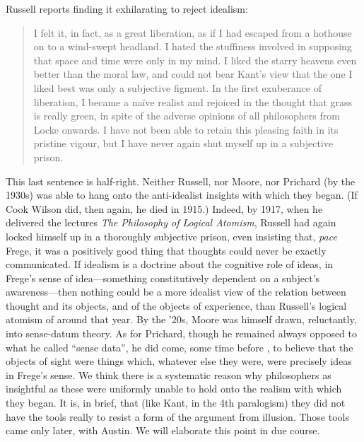 Russell reports finding it exhilarating to reject idealism:
\begin{quote}
	I felt it, in fact, as a great liberation, as if I had escaped from a hothouse on to a wind-swept headland. I hated the stuffiness involved in supposing that space and time were only in my mind. I liked the starry heavens even better than the moral law, and could not bear Kant’s view that the one I liked best was only a subjective figment. In the first exuberance of liberation, I became a naïve realist and rejoiced in the thought that grass is really green, in spite of the adverse opinions of all philosophers from Locke onwards. I have not been able to retain this pleasing faith in its pristine vigour, but I have never again shut myself up in a subjective prison. \citep[48]{Russell:1959fv}
\end{quote}
This last sentence is half-right. Neither Russell, nor Moore, nor Prichard (by the 1930s) was able to hang onto the anti-idealist insights with which they began. (If Cook Wilson did, then again, he died in 1915.) Indeed, by 1917, when he delivered the lectures \emph{The Philosophy of Logical Atomism}, Russell had again locked himself up in a thoroughly subjective prison, even insisting that, \emph{pace} Frege, it was a positively good thing that thoughts could never be exactly communicated. If idealism is a doctrine about the cognitive role of ideas, in Frege's sense of idea---something constitutively dependent on a subject's awareness---then nothing could be a more idealist view of the relation between thought and its objects, and of the objects of experience, than Russell's logical atomism of around that year. By the '20s, Moore was himself drawn, reluctantly, into sense-datum theory. As for Prichard, though he remained always opposed to what he called ``sense data'', he did come, some time before \citeyear{Prichard:1938ve}, to believe that the objects of sight were things which, whatever else they were, were precisely ideas in Frege's sense. We think there is a systematic reason why philosophers as insightful as these were uniformly unable to hold onto the realism with which they began. It is, in brief, that (like Kant, in the 4th paralogism) they did not have the tools really to resist a form of the argument from illusion. Those tools came only later, with Austin. We will elaborate this point in due course.

